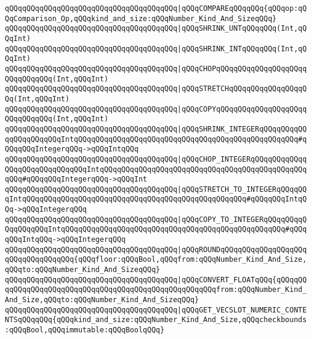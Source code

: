 \verb|qQQqqQQqqQQqqQQqqQQqqQQqqQQqqQQqqQQqqQQq|\verb#|qQQqCOMPAREqQQqqQQq{qQQqop:qQQqComparison_Op,qQQqkind_and_size:qQQqNumber_Kind_And_SizeqQQq}#\newline
\newline
\verb|qQQqqQQqqQQqqQQqqQQqqQQqqQQqqQQqqQQqqQQq|\verb#|qQQqSHRINK_UNTqQQqqQQq(Int,qQQqInt)#\newline
\verb|qQQqqQQqqQQqqQQqqQQqqQQqqQQqqQQqqQQqqQQq|\verb#|qQQqSHRINK_INTqQQqqQQq(Int,qQQqInt)#\newline
\verb|qQQqqQQqqQQqqQQqqQQqqQQqqQQqqQQqqQQqqQQq|\verb#|qQQqCHOPqQQqqQQqqQQqqQQqqQQqqQQqqQQqqQQq(Int,qQQqInt)#\newline
\verb|qQQqqQQqqQQqqQQqqQQqqQQqqQQqqQQqqQQqqQQq|\verb#|qQQqSTRETCHqQQqqQQqqQQqqQQqqQQq(Int,qQQqInt)#\newline
\verb|qQQqqQQqqQQqqQQqqQQqqQQqqQQqqQQqqQQqqQQq|\verb#|qQQqCOPYqQQqqQQqqQQqqQQqqQQqqQQqqQQqqQQq(Int,qQQqInt)#\newline
\newline
\verb|qQQqqQQqqQQqqQQqqQQqqQQqqQQqqQQqqQQqqQQq|\verb#|qQQqSHRINK_INTEGERqQQqqQQqqQQqqQQqqQQqqQQqIntqQQqqQQqqQQqqQQqqQQqqQQqqQQqqQQqqQQqqQQqqQQqqQQqqQQq#\verb|#qQQqqQQqIntegerqQQq->qQQqIntqQQq|\newline
\verb|qQQqqQQqqQQqqQQqqQQqqQQqqQQqqQQqqQQqqQQq|\verb#|qQQqCHOP_INTEGERqQQqqQQqqQQqqQQqqQQqqQQqqQQqqQQqIntqQQqqQQqqQQqqQQqqQQqqQQqqQQqqQQqqQQqqQQqqQQqqQQqqQQq#\verb|#qQQqqQQqIntegerqQQq->qQQqInt|\newline
\verb|qQQqqQQqqQQqqQQqqQQqqQQqqQQqqQQqqQQqqQQq|\verb#|qQQqSTRETCH_TO_INTEGERqQQqqQQqIntqQQqqQQqqQQqqQQqqQQqqQQqqQQqqQQqqQQqqQQqqQQqqQQqqQQq#\verb|#qQQqqQQqIntqQQq->qQQqIntegerqQQq|\newline
\verb|qQQqqQQqqQQqqQQqqQQqqQQqqQQqqQQqqQQqqQQq|\verb#|qQQqCOPY_TO_INTEGERqQQqqQQqqQQqqQQqqQQqIntqQQqqQQqqQQqqQQqqQQqqQQqqQQqqQQqqQQqqQQqqQQqqQQqqQQq#\verb|#qQQqqQQqIntqQQq->qQQqIntegerqQQq|\newline
\newline
\verb|qQQqqQQqqQQqqQQqqQQqqQQqqQQqqQQqqQQqqQQq|\verb#|qQQqROUNDqQQqqQQqqQQqqQQqqQQqqQQqqQQqqQQqqQQq{qQQqfloor:qQQqBool,qQQqfrom:qQQqNumber_Kind_And_Size,qQQqto:qQQqNumber_Kind_And_SizeqQQq}#\newline
\verb|qQQqqQQqqQQqqQQqqQQqqQQqqQQqqQQqqQQqqQQq|\verb#|qQQqCONVERT_FLOATqQQq{qQQqqQQqqQQqqQQqqQQqqQQqqQQqqQQqqQQqqQQqqQQqqQQqqQQqqQQqfrom:qQQqNumber_Kind_And_Size,qQQqto:qQQqNumber_Kind_And_SizeqQQq}#\newline
\newline
\verb|qQQqqQQqqQQqqQQqqQQqqQQqqQQqqQQqqQQqqQQq|\verb#|qQQqGET_VECSLOT_NUMERIC_CONTENTSqQQqqQQq{qQQqkind_and_size:qQQqNumber_Kind_And_Size,qQQqcheckbounds:qQQqBool,qQQqimmutable:qQQqBoolqQQq}#\newline

